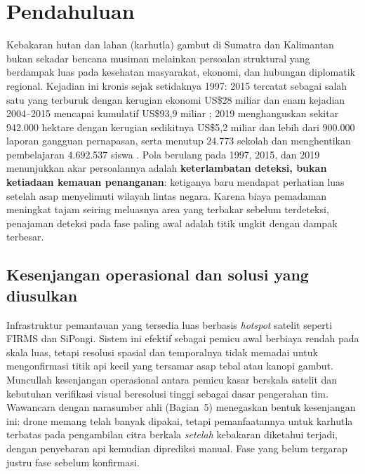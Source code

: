 
\section{Pendahuluan}

Kebakaran hutan dan lahan (karhutla) gambut di Sumatra dan Kalimantan bukan
sekadar bencana musiman melainkan persoalan struktural yang berdampak luas pada
kesehatan masyarakat, ekonomi, dan hubungan diplomatik regional. Kejadian ini
kronis sejak setidaknya 1997: 2015 tercatat sebagai salah satu yang terburuk
dengan kerugian ekonomi US\$28 miliar dan enam kejadian 2004--2015 mencapai
kumulatif US\$93,9 miliar \cite{worldbank2019}; 2019 menghanguskan sekitar
942.000 hektare dengan kerugian sedikitnya US\$5,2 miliar dan lebih dari
900.000 laporan gangguan pernapasan, serta menutup 24.773 sekolah dan
menghentikan pembelajaran 4.692.537 siswa \cite{unicef2019}. Pola berulang pada
1997, 2015, dan 2019 menunjukkan akar persoalannya adalah \textbf{keterlambatan
deteksi, bukan ketiadaan kemauan penanganan}: ketiganya baru mendapat perhatian
luas setelah asap menyelimuti wilayah lintas negara. Karena biaya pemadaman
meningkat tajam seiring meluasnya area yang terbakar sebelum terdeteksi,
penajaman deteksi pada fase paling awal adalah titik ungkit dengan dampak
terbesar.

\subsection{Kesenjangan operasional dan solusi yang diusulkan}

Infrastruktur pemantauan yang tersedia luas berbasis \emph{hotspot} satelit
seperti FIRMS dan SiPongi. Sistem ini efektif sebagai pemicu awal berbiaya
rendah pada skala luas, tetapi resolusi spasial dan temporalnya tidak memadai
untuk mengonfirmasi titik api kecil yang tersamar asap tebal atau kanopi gambut.
Muncullah kesenjangan operasional antara pemicu kasar berskala satelit dan
kebutuhan verifikasi visual beresolusi tinggi sebagai dasar pengerahan tim.
Wawancara dengan narasumber ahli (Bagian~5) menegaskan bentuk kesenjangan ini:
drone memang telah banyak dipakai, tetapi pemanfaatannya untuk karhutla terbatas
pada pengambilan citra berkala \emph{setelah} kebakaran diketahui terjadi,
dengan penyebaran api kemudian diprediksi manual. Fase yang belum tergarap
justru fase sebelum konfirmasi.

